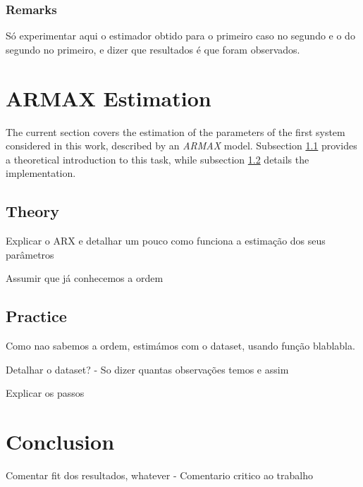 \documentclass[12pt]{article}
\begin{document}
\subsubsection{Remarks}

Só experimentar aqui o estimador obtido para o primeiro caso no segundo e o do segundo no primeiro, e dizer que resultados é que foram observados.


\section{ARMAX Estimation}
\label{armax_estimation}

The current section covers the estimation of the parameters of the first system considered in this work, described by an \emph{ARMAX} model. Subsection \ref{theory_armax} provides a theoretical introduction to this task, while subsection \ref{parameter_estimation_armax} details the implementation.

\subsection{Theory}
\label{theory_armax}

Explicar o ARX e detalhar um pouco como funciona a estimação dos seus parâmetros

Assumir que já conhecemos a ordem

\subsection{Practice}
\label{parameter_estimation_armax}


Como nao sabemos a ordem, estimámos com o dataset, usando função blablabla.

Detalhar o dataset? - So dizer quantas observações temos e assim

Explicar os passos

\section{Conclusion}
\label{conclusion}

Comentar fit dos resultados, whatever - Comentario critico ao trabalho
\end{document}
